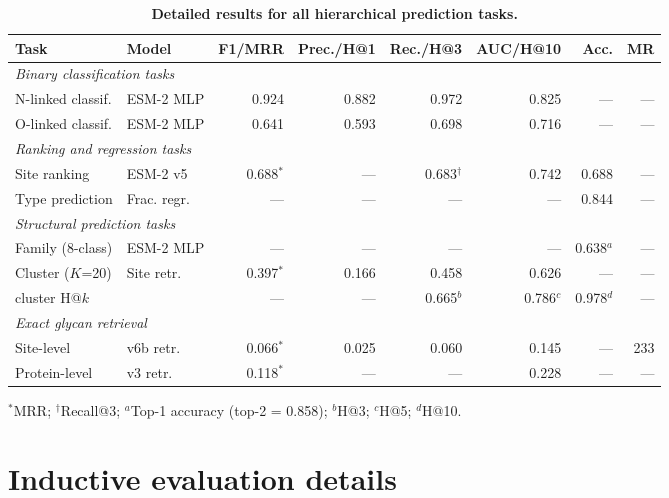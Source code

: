 \documentclass[11pt,a4paper]{article}
\begin{document}
\begin{table}[H]
\centering
\caption{\textbf{Detailed results for all hierarchical prediction tasks.}}
\label{tab:detailed_tasks}
\small
\begin{tabular}{llrrrrrr}
\toprule
\textbf{Task} & \textbf{Model} & \textbf{F1/MRR} & \textbf{Prec./H@1} & \textbf{Rec./H@3} & \textbf{AUC/H@10} & \textbf{Acc.} & \textbf{MR} \\
\midrule
\multicolumn{8}{l}{\textit{Binary classification tasks}} \\
N-linked classif. & ESM-2 MLP & 0.924 & 0.882 & 0.972 & 0.825 & --- & --- \\
O-linked classif. & ESM-2 MLP & 0.641 & 0.593 & 0.698 & 0.716 & --- & --- \\
\midrule
\multicolumn{8}{l}{\textit{Ranking and regression tasks}} \\
Site ranking & ESM-2 v5 & 0.688$^*$ & --- & 0.683$^\dagger$ & 0.742 & 0.688 & --- \\
Type prediction & Frac. regr. & --- & --- & --- & --- & 0.844 & --- \\
\midrule
\multicolumn{8}{l}{\textit{Structural prediction tasks}} \\
Family (8-class) & ESM-2 MLP & --- & --- & --- & --- & 0.638$^a$ & --- \\
Cluster ($K$=20) & Site retr. & 0.397$^*$ & 0.166 & 0.458 & 0.626 & --- & --- \\
\quad cluster H@$k$ & & --- & --- & 0.665$^b$ & 0.786$^c$ & 0.978$^d$ & --- \\
\midrule
\multicolumn{8}{l}{\textit{Exact glycan retrieval}} \\
Site-level & v6b retr. & 0.066$^*$ & 0.025 & 0.060 & 0.145 & --- & 233 \\
Protein-level & v3 retr. & 0.118$^*$ & --- & --- & 0.228 & --- & --- \\
\bottomrule
\end{tabular}

\vspace{0.3em}
\raggedright\scriptsize
$^*$MRR; $^\dagger$Recall@3; $^a$Top-1 accuracy (top-2 = 0.858);
$^b$H@3; $^c$H@5; $^d$H@10.
\end{table}

\section{Inductive evaluation details}
\label{sec:inductive}
\end{document}
